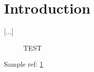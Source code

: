 \section{Introduction}
\label{se:intro}

[...]

  
\begin{figure}
TEST
\label{this is a caption}
\label{fi:myfigure}
\end{figure}

Sample ref: \ref{fi:myfigure}